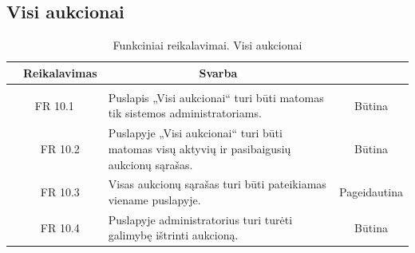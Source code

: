 \documentclass{VUMIFPSkursinis}
\begin{document}
	\subsection{Visi aukcionai}
	\begin{table}[H]
		\caption{Funkciniai reikalavimai. Visi aukcionai}
		\begin{tabular}{|p{1cm}|p{1cm}|p{}|p{}|}
			\hline
			\rowcolor{gray!50}
			\multicolumn{2}{|c|}{{\bfseries Kodas}}&
			\multicolumn{1}{c|}{{\bfseries Reikalavimas}}&
			\multicolumn{1}{c|}{{\bfseries Svarba}}\\
			\hline
			\rowcolor{lightgray}
			\multicolumn{4}{|c|}{Visi aukcionai}\\
			\hline
			\multicolumn{2}{|c|}{FR 10.1}&
			{Puslapis „Visi aukcionai“ turi būti matomas tik sistemos administratoriams.
			}&
			\multicolumn{1}{c|}{Būtina}\\
			\hline
			\multicolumn{1}{|c}{}&
			\multicolumn{1}{c|}{FR 10.2}&
			{Puslapyje „Visi aukcionai“ turi būti matomas visų aktyvių ir pasibaigusių aukcionų sąrašas.
			}&
			\multicolumn{1}{c|}{Būtina}\\
			\hline
			\multicolumn{1}{|c}{}&
			\multicolumn{1}{c|}{FR 10.3}&
			{Visas aukcionų sąrašas turi būti pateikiamas viename puslapyje.
			}&
			\multicolumn{1}{c|}{Pageidautina}\\
			\hline
			\multicolumn{1}{|c}{}&
			\multicolumn{1}{c|}{FR 10.4}&
			{Puslapyje administratorius turi turėti galimybę ištrinti aukcioną.
			}&
			\multicolumn{1}{c|}{Būtina}\\
			\hline
		\end{tabular}
	\end{table}
\end{document}
